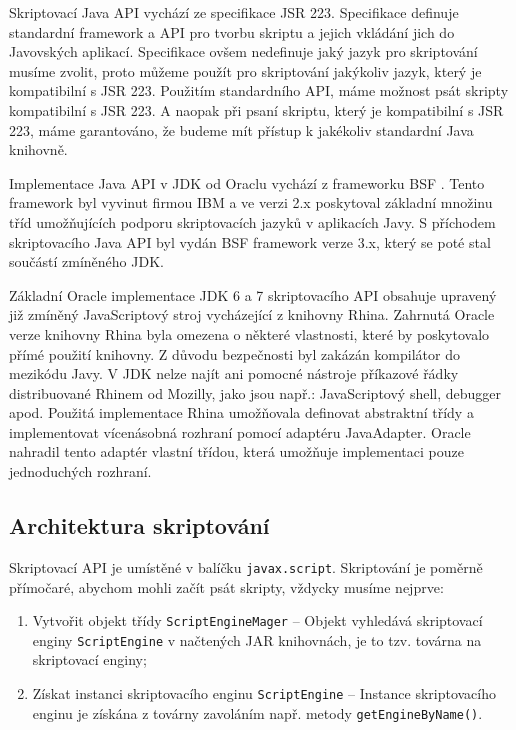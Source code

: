 Skriptovací Java API vychází ze specifikace JSR 223. Specifikace definuje standardní framework a API pro tvorbu skriptu a jejich vkládání jich do Javovských aplikací. Specifikace ovšem nedefinuje jaký jazyk pro skriptování musíme zvolit, proto můžeme použít pro skriptování jakýkoliv jazyk, který je kompatibilní s JSR 223. Použitím standardního API, máme možnost psát skripty kompatibilní s JSR 223. A naopak při psaní skriptu, který je kompatibilní s JSR 223, máme garantováno, že budeme mít přístup k jakékoliv standardní Java knihovně.

Implementace Java API v JDK od Oraclu vychází z frameworku BSF \cite{Bibliography.BSF.Framework}. Tento framework byl vyvinut firmou IBM a ve verzi 2.x poskytoval základní množinu tříd umožňujících podporu skriptovacích jazyků v aplikacích Javy. S příchodem skriptovacího Java API byl vydán BSF framework verze 3.x, který se poté stal součástí zmíněného JDK.

Základní Oracle implementace JDK 6 a 7 skriptovacího API obsahuje upravený již zmíněný JavaScriptový stroj vycházející z knihovny Rhina. Zahrnutá Oracle verze knihovny Rhina byla omezena o některé vlastnosti, které by poskytovalo přímé použití knihovny. Z důvodu bezpečnosti byl zakázán kompilátor do mezikódu Javy. V JDK nelze najít ani pomocné nástroje příkazové řádky distribuované Rhinem od Mozilly, jako jsou např.: JavaScriptový shell, debugger apod. Použitá implementace Rhina umožňovala definovat abstraktní třídy a implementovat vícenásobná rozhraní pomocí adaptéru JavaAdapter. Oracle nahradil tento adaptér vlastní třídou, která umožňuje implementaci pouze jednoduchých rozhraní. 

\subsection{Architektura skriptování}
\label{Chapter.JavaScriptInJavaAnalysis.ScriptingJavaAPI.ArchitectureOfScripting}

\bigskip \noindent Skriptovací API je umístěné v balíčku \texttt{javax.script}. Skriptování je poměrně přímočaré, abychom mohli začít psát skripty, vždycky musíme nejprve:

\begin{enumerate}
  \item Vytvořit objekt třídy \texttt{ScriptEngineMager} -- Objekt vyhledává skriptovací enginy \texttt{ScriptEngine} v načtených JAR knihovnách, je to tzv. továrna na skriptovací enginy;
  \item Získat instanci skriptovacího enginu \texttt{ScriptEngine} -- Instance skriptovacího enginu je získána z továrny zavoláním např. metody \texttt{getEngineByName()}. 
\end{enumerate}

